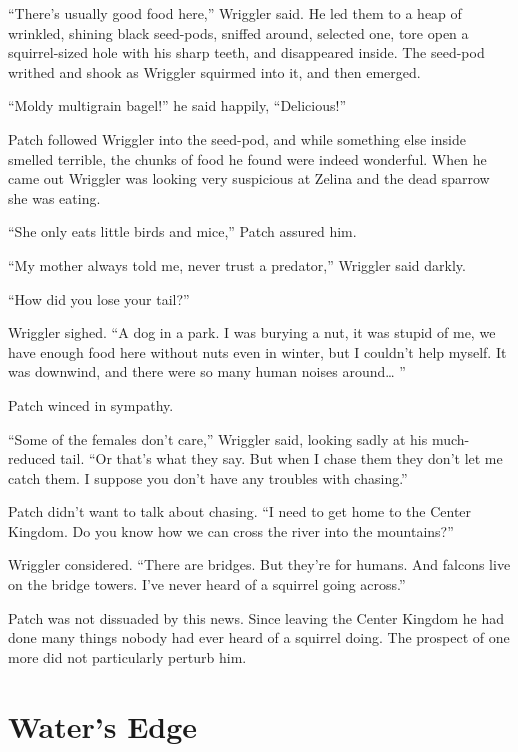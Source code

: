 \documentclass[12pt]{memoir}
\begin{document}
“There’s usually good food here,” Wriggler said. He led them to a heap
of wrinkled, shining black seed-pods, sniffed around, selected one,
tore open a squirrel-sized hole with his sharp teeth, and disappeared
inside. The seed-pod writhed and shook as Wriggler squirmed into it,
and then emerged.

“Moldy multigrain bagel!” he said happily, “Delicious!”

Patch followed Wriggler into the seed-pod, and while something else
inside smelled terrible, the chunks of food he found were indeed
wonderful. When he came out Wriggler was looking very suspicious at
Zelina and the dead sparrow she was eating.

“She only eats little birds and mice,” Patch assured him.

“My mother always told me, never trust a predator,” Wriggler said
darkly.

“How did you lose your tail?”

Wriggler sighed. “A dog in a park. I was burying a nut, it was stupid
of me, we have enough food here without nuts even in winter, but I
couldn’t help myself. It was downwind, and there were so many human
noises around… ”

Patch winced in sympathy.

“Some of the females don’t care,” Wriggler said, looking sadly at his
much-reduced tail. “Or that’s what they say. But when I chase them
they don’t let me catch them. I suppose you don’t have any troubles
with chasing.”

Patch didn’t want to talk about chasing. “I need to get home to the
Center Kingdom. Do you know how we can cross the river into the
mountains?”

Wriggler considered. “There are bridges. But they’re for humans. And
falcons live on the bridge towers. I’ve never heard of a squirrel
going across.”

Patch was not dissuaded by this news. Since leaving the Center Kingdom
he had done many things nobody had ever heard of a squirrel doing. The
prospect of one more did not particularly perturb him.


\section{Water’s Edge}
\end{document}
